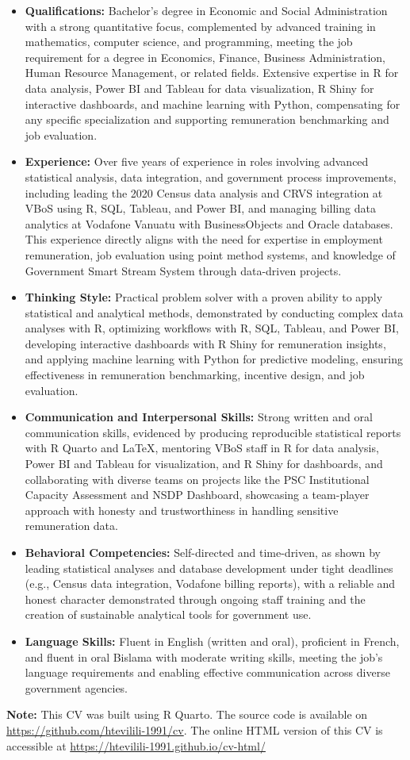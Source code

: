 \documentclass[
  letterpaper,
  DIV=11,
  numbers=noendperiod]{scrartcl}
\providecommand{\tightlist}{%
  \setlength{\itemsep}{0pt}\setlength{\parskip}{0pt}}
\begin{document}
\begin{itemize}
\tightlist
\item
  \textbf{Qualifications:} Bachelor's degree in Economic and Social
  Administration with a strong quantitative focus, complemented by
  advanced training in mathematics, computer science, and programming,
  meeting the job requirement for a degree in Economics, Finance,
  Business Administration, Human Resource Management, or related fields.
  Extensive expertise in R for data analysis, Power BI and Tableau for
  data visualization, R Shiny for interactive dashboards, and machine
  learning with Python, compensating for any specific specialization and
  supporting remuneration benchmarking and job evaluation.
\item
  \textbf{Experience:} Over five years of experience in roles involving
  advanced statistical analysis, data integration, and government
  process improvements, including leading the 2020 Census data analysis
  and CRVS integration at VBoS using R, SQL, Tableau, and Power BI, and
  managing billing data analytics at Vodafone Vanuatu with
  BusinessObjects and Oracle databases. This experience directly aligns
  with the need for expertise in employment remuneration, job evaluation
  using point method systems, and knowledge of Government Smart Stream
  System through data-driven projects.
\item
  \textbf{Thinking Style:} Practical problem solver with a proven
  ability to apply statistical and analytical methods, demonstrated by
  conducting complex data analyses with R, optimizing workflows with R,
  SQL, Tableau, and Power BI, developing interactive dashboards with R
  Shiny for remuneration insights, and applying machine learning with
  Python for predictive modeling, ensuring effectiveness in remuneration
  benchmarking, incentive design, and job evaluation.
\item
  \textbf{Communication and Interpersonal Skills:} Strong written and
  oral communication skills, evidenced by producing reproducible
  statistical reports with R Quarto and LaTeX, mentoring VBoS staff in R
  for data analysis, Power BI and Tableau for visualization, and R Shiny
  for dashboards, and collaborating with diverse teams on projects like
  the PSC Institutional Capacity Assessment and NSDP Dashboard,
  showcasing a team-player approach with honesty and trustworthiness in
  handling sensitive remuneration data.
\item
  \textbf{Behavioral Competencies:} Self-directed and time-driven, as
  shown by leading statistical analyses and database development under
  tight deadlines (e.g., Census data integration, Vodafone billing
  reports), with a reliable and honest character demonstrated through
  ongoing staff training and the creation of sustainable analytical
  tools for government use.
\item
  \textbf{Language Skills:} Fluent in English (written and oral),
  proficient in French, and fluent in oral Bislama with moderate writing
  skills, meeting the job's language requirements and enabling effective
  communication across diverse government agencies.
\end{itemize}

\textbf{Note:} This CV was built using R Quarto. The source code is
available on \url{https://github.com/htevilili-1991/cv}. The online HTML
version of this CV is accessible at
\url{https://htevilili-1991.github.io/cv-html/}
\end{document}
